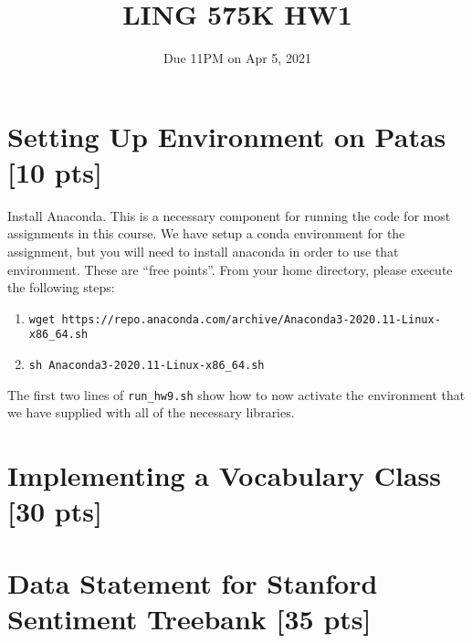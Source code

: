 \documentclass[11pt]{article}
\begin{document}
\title{LING 575K HW1}
\date{\vspace{-0.2in}Due 11PM on Apr 5, 2021}
\maketitle

\section{Setting Up Environment on Patas [10 pts]}

Install Anaconda. This is a necessary component for running the code for most assignments in this course.  We have setup a conda environment for the assignment, but you will need to install anaconda in order to use that environment.  These are ``free points''.  From your home directory, please execute the following steps:
\begin{enumerate}
	\item \texttt{wget https://repo.anaconda.com/archive/Anaconda3-2020.11-Linux-x86\_64.sh}
	\item \texttt{sh Anaconda3-2020.11-Linux-x86\_64.sh}
\end{enumerate}
The first two lines of \texttt{run\_hw9.sh} show how to now activate the environment that we have supplied with all of the necessary libraries.


\section{Implementing a Vocabulary Class [30 pts]}

\section{Data Statement for Stanford Sentiment Treebank [35 pts]}
\end{document}
